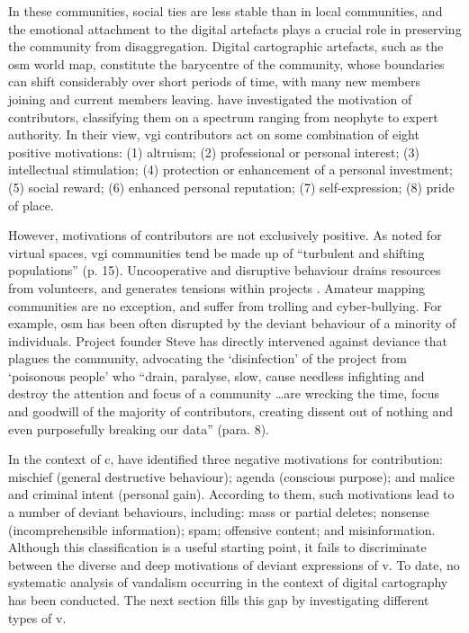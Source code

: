 \documentclass{article} \usepackage{graphicx,xspace}
\begin{document}
In these communities, social ties are less stable than in local communities, and the emotional attachment to the digital artefacts plays a crucial role in preserving the community from disaggregation.
Digital cartographic artefacts, such as the \gls{osm} world map, constitute the barycentre of the community, whose boundaries can shift considerably over short periods of time, with many new members joining and current members leaving.
\cite{coleman:2009:volunteered} have investigated the motivation of contributors, classifying them on a spectrum ranging from neophyte to expert authority.
In their view, \gls{vgi} contributors act on some combination of eight positive motivations:
(1) altruism;
(2) professional or personal interest;
(3) intellectual stimulation;
(4) protection or enhancement of a personal investment;
(5) social reward;
(6) enhanced personal reputation;
(7) self-expression;
(8) pride of place.

However, motivations of contributors are not exclusively positive. 
As \cite{williams:2004:understandingking} noted for virtual spaces, \gls{vgi} communities tend be made up of ``turbulent and shifting populations'' (p. 15).
Uncooperative and disruptive behaviour drains resources from volunteers, and generates tensions within projects \citep{wall:2007:policing}.
Amateur mapping communities are no exception, and suffer from trolling and cyber-bullying.
For example, \gls{osm} has been often disrupted by the deviant behaviour of a minority of individuals.
Project founder Steve \cite{coast:2010:enough} has directly intervened against deviance that plagues the community, advocating the `disinfection' of the project from `poisonous people' who ``drain, paralyse, slow, cause needless infighting and destroy the attention and focus of a community \ldots are wrecking the time, focus and goodwill of the majority of contributors, creating dissent out of nothing and even purposefully breaking our data'' (para. 8).

In the context of \gls{c}, \cite{coleman:2009:volunteered} have identified three negative motivations for contribution:
mischief (general destructive behaviour);
agenda (conscious purpose);
and malice and criminal intent (personal gain).
According to them, such motivations lead to a number of deviant behaviours, including: 
mass or partial deletes;
nonsense (incomprehensible information);
spam;
offensive content;
and misinformation.
Although this classification is a useful starting point, it fails to discriminate between the diverse and deep motivations of deviant expressions of \gls{v}.  
To date, no systematic analysis of vandalism occurring in the context of digital cartography has been conducted.
The next section fills this gap by investigating different types of \gls{v}.
\end{document}
